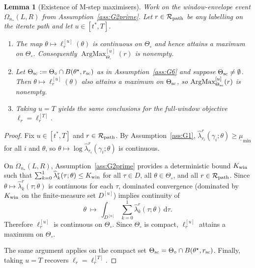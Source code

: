 \documentclass{statsoc}
\newtheorem{lemma}[lemma]{Lemma}
\newcommand{\dd}{\mathrm{d}}
\newcommand{\1}{\mathbbm{1}}
\begin{document}
\begin{lemma}[Existence of M-step maximisers]\label{lem:existence-M}
Work on the window-envelope event $\Omega_{n_*}(L,R)$ from Assumption~\ref{ass:G2prime}.
Let $r\in\mathcal R_{\rm path}$ be any labelling on the iterate path and let $u\in[t^\ast,T]$.

\begin{enumerate}[nosep,label=(\alph*)]
\item The map $\theta\mapsto \ell_r^{[u]}(\theta)$ is continuous on $\Theta_\circ$ and hence attains a maximum on $\Theta_\circ$.
Consequently $\operatorname{ArgMax}_{\Theta_\circ}^{[u]}(r)$ is nonempty.

\item Let $\Theta_{\rm sc}:=\Theta_\circ\cap B(\theta^\star,r_{\rm sc})$ as in Assumption~\ref{ass:G6} and
suppose $\Theta_{\rm sc}\neq\emptyset$.
Then $\theta\mapsto \ell_r^{[u]}(\theta)$ also attains a maximum on $\Theta_{\rm sc}$, so
$\operatorname{ArgMax}_{\Theta_{\rm sc}}^{[u]}(r)$ is nonempty.

\item Taking $u=T$ yields the same conclusions for the full-window objective $\ell_r=\ell_r^{[T]}$.
\end{enumerate}
\end{lemma}

\begin{proof}
Fix $u\in[t^\ast,T]$ and $r\in\mathcal R_{\rm path}$.
By Assumption~\ref{ass:G1}, $\widehat\lambda_{r_i}^r(\gamma_i;\theta)\ge \underline\mu_{\min}$ for all $i$ and $\theta$,
so $\theta\mapsto \log\widehat\lambda_{r_i}^r(\gamma_i;\theta)$ is continuous.

On $\Omega_{n_*}(L,R)$, Assumption~\ref{ass:G2prime} provides a deterministic bound $K_{\rm win}$ such that
$\sum_{k=0}^1\widehat\lambda_k^r(\tau;\theta)\le K_{\rm win}$ for all $\tau\in D$, all $\theta\in\Theta_\circ$,
and all $r\in\mathcal R_{\rm path}$. Since $\theta\mapsto \widehat\lambda_k^r(\tau;\theta)$ is continuous for each $\tau$,
dominated convergence (dominated by $K_{\rm win}$ on the finite-measure set $D^{[u]}$) implies continuity of
\[
\theta\ \longmapsto\ \int_{D^{[u]}} \sum_{k=0}^1 \widehat\lambda_k^r(\tau;\theta)\,\dd\tau .
\]
Therefore $\ell_r^{[u]}$ is continuous on $\Theta_\circ$. Since $\Theta_\circ$ is compact,
$\ell_r^{[u]}$ attains a maximum on $\Theta_\circ$.

The same argument applies on the compact set $\Theta_{\rm sc}=\Theta_\circ\cap B(\theta^\star,r_{\rm sc})$.
Finally, taking $u=T$ recovers $\ell_r=\ell_r^{[T]}$.
\end{proof}
\end{document}
